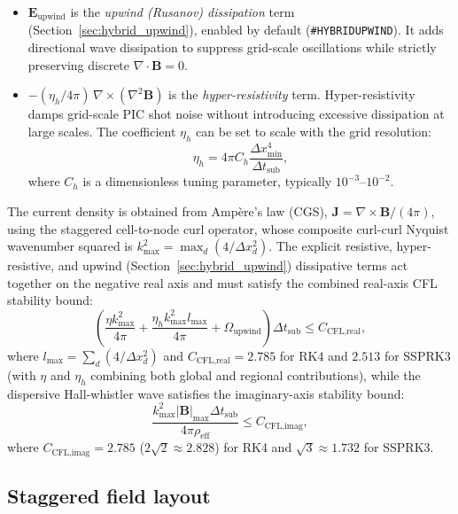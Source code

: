\documentclass[a4paper, 11pt]{article}
\begin{document}
\begin{itemize}
\begin{itemize}
  \end{itemize}
  A minimum density floor $\rho_{\min}$ is applied to the $1/\rho_q$ factors in the Hall and electron pressure terms to prevent unbounded contributions in near-vacuum cells.
  \item $\mathbf{E}_{\text{upwind}}$ is the \emph{upwind (Rusanov) dissipation} term (Section~\ref{sec:hybrid_upwind}), enabled by default (\texttt{\#HYBRIDUPWIND}). It adds directional wave dissipation to suppress grid-scale oscillations while strictly preserving discrete $\nabla \cdot \mathbf{B} = 0$.
  \item $-(\eta_h/4\pi)\,\nabla\times(\nabla^2\mathbf{B})$ is the \emph{hyper-resistivity} term. Hyper-resistivity damps grid-scale PIC shot noise without introducing excessive dissipation at large scales. The coefficient $\eta_h$ can be set to scale with the grid resolution:
  \begin{equation}
  \eta_h = 4\pi C_h \frac{\Delta x_{\min}^4}{\Delta t_{\text{sub}}},
  \end{equation}
  where $C_h$ is a dimensionless tuning parameter, typically $10^{-3}$--$10^{-2}$.
\end{itemize}
The current density is obtained from Amp\`ere's law (CGS), $\mathbf{J} = \nabla\times\mathbf{B}/(4\pi)$, using the staggered cell-to-node curl operator, whose composite curl-curl Nyquist wavenumber squared is $k_{\max}^2 = \max_d (4/\Delta x_d^2)$. The explicit resistive, hyper-resistive, and upwind (Section~\ref{sec:hybrid_upwind}) dissipative terms act together on the negative real axis and must satisfy the combined real-axis CFL stability bound:
\begin{equation}
\left( \frac{\eta k_{\max}^2}{4\pi} + \frac{\eta_h k_{\max}^2 l_{\max}}{4\pi} + \Omega_{\text{upwind}} \right) \Delta t_{\text{sub}} \le C_{\text{CFL,real}},
\end{equation}
where $l_{\max} = \sum_d (4/\Delta x_d^2)$ and $C_{\text{CFL,real}} = 2.785$ for RK4 and $2.513$ for SSPRK3 (with $\eta$ and $\eta_h$ combining both global and regional contributions), while the dispersive Hall-whistler wave satisfies the imaginary-axis stability bound:
\begin{equation}
\frac{k_{\max}^2 |\mathbf{B}|_{\max} \Delta t_{\text{sub}}}{4\pi \rho_{\text{eff}}} \le C_{\text{CFL,imag}},
\end{equation}
where $C_{\text{CFL,imag}} = 2.785$ ($2\sqrt{2} \approx 2.828$) for RK4 and $\sqrt{3} \approx 1.732$ for SSPRK3.

\subsection{Staggered field layout}
\end{document}
